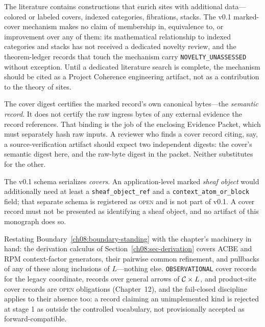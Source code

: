 \begin{boundary}\label{ch08:boundary-novelty}
The literature contains constructions that enrich sites with additional data---colored or labeled covers, indexed categories, fibrations, stacks. The v0.1 marked-cover mechanism makes no claim of membership in, equivalence to, or improvement over any of them: its mathematical relationship to indexed categories and stacks has not received a dedicated novelty review, and the theorem-ledger records that touch the mechanism carry \texttt{NOVELTY\_UNASSESSED} without exception. Until a dedicated literature search is complete, the mechanism should be cited as a Project Coherence engineering artifact, not as a contribution to the theory of sites.
\end{boundary}

\begin{boundary}\label{ch08:boundary-packet}
The cover digest certifies the marked record's own canonical bytes---the \emph{semantic record}. It does not certify the raw ingress bytes of any external evidence the record references. That binding is the job of the enclosing Evidence Packet, which must separately hash raw inputs. A reviewer who finds a cover record citing, say, a source-verification artifact should expect two independent digests: the cover's semantic digest here, and the raw-byte digest in the packet. Neither substitutes for the other.
\end{boundary}

\begin{boundary}\label{ch08:boundary-sheafobject}
The v0.1 schema serializes \emph{covers}. An application-level marked \emph{sheaf object} would additionally need at least a \texttt{sheaf\_object\_ref} and a \texttt{context\_atom\_or\_block} field; that separate schema is registered as \textsc{open} and is not part of v0.1. A cover record must not be presented as identifying a sheaf object, and no artifact of this monograph does so.
\end{boundary}

\begin{boundary}\label{ch08:boundary-scope}
Restating Boundary~\ref{ch08:boundary-standing} with the chapter's machinery in hand: the derivation calculus of Section~\ref{ch08:sec-derivation} covers ACBE and RPM context-factor generators, their pairwise common refinement, and pullbacks of any of these along inclusions of $L$---nothing else. \texttt{OBSERVATIONAL} cover records for the legacy coordinate, records over general arrows of $\mathcal{C}\times L$, and product-site cover records are \textsc{open} obligations (Chapter~12), and the fail-closed discipline applies to their absence too: a record claiming an unimplemented kind is rejected at stage 1 as outside the controlled vocabulary, not provisionally accepted as forward-compatible.
\end{boundary}

